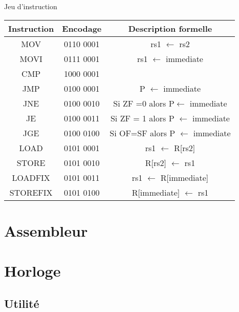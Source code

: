 \documentclass{beamer}
\begin{document}
    \begin{frame}{Jeu d'instruction}

        \begin{center}
        \begin{tabular}{| c || c | c |}
            Instruction & Encodage & Description formelle \\ \hline
            MOV   & 0110 0001 & rs1 $\gets$ rs2\\ \hline
            MOVI  & 0111 0001 & rs1 $\gets$ immediate\\\hline
            CMP   & 1000 0001 & \\ \hline
            JMP   & 0100 0001 & P $\gets$ immediate\\ \hline
            JNE   & 0100 0010 & Si ZF =0 alors P$\gets$ immediate\\ \hline
            JE    & 0100 0011 &  Si ZF = 1 alors P $\gets$ immediate \\ \hline
            JGE   & 0100 0100 & Si OF=SF alors P $\gets$ immediate\\ \hline
            LOAD  & 0101 0001 & rs1 $\gets$ R[rs2]\\ \hline
            STORE & 0101 0010 & R[rs2] $\gets$ rs1\\ \hline
            LOADFIX  & 0101 0011 & rs1 $\gets$ R[immediate]\\ \hline
            STOREFIX & 0101 0100 & R[immediate] $\gets$ rs1\\ \hline
        \end{tabular}
    \end{center}

    \end{frame}

\section{Assembleur}
    \begin{frame}
    \end{frame}
\section{Horloge}
    \begin{frame}
    \end{frame}

\subsection{Utilité}
\end{document}
